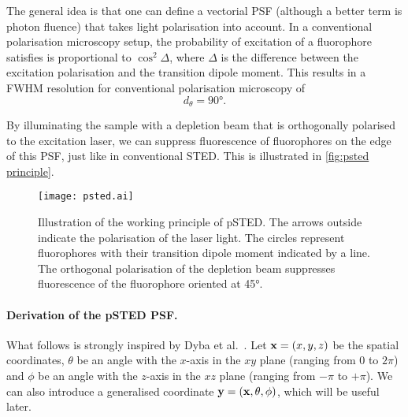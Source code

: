 The general idea is that one can define a vectorial PSF (although a better term is photon fluence) that takes light polarisation into account. In a conventional polarisation microscopy setup, the probability of excitation of a fluorophore satisfies is proportional to $ \cos^2 \Delta $, where $ \Delta $ is the difference between the excitation polarisation and the transition dipole moment. This results in a FWHM resolution for conventional polarisation microscopy of 
\begin{equation}
	d_\theta = \ang{90}.
\end{equation}


By illuminating the sample with a depletion beam that is orthogonally polarised to the excitation laser, we can suppress fluorescence of fluorophores on the edge of this PSF, just like in conventional STED. This is illustrated in \autoref{fig:psted principle}.

\begin{figure}
	\centering
	\texttt{[image: psted.ai]}
	\caption{
		Illustration of the working principle of pSTED. The arrows outside indicate the polarisation of the laser light. The circles represent fluorophores with their transition dipole moment indicated by a line. The orthogonal polarisation of the depletion beam suppresses fluorescence of the fluorophore oriented at \ang{45}.
	}
	\label{fig:psted principle}
\end{figure}

\paragraph{Derivation of the pSTED PSF.} What follows is strongly inspired by Dyba et al.~\cite{Dyba2005}. Let $ \vb{x} = (x, y, z)$ be the spatial coordinates, $ \theta $ be an angle with the $ x $-axis in the $ xy $ plane (ranging from $ 0 $ to $ 2\pi$) and $ \phi $ be an angle with the $ z $-axis in the $ xz $ plane (ranging from $ -\pi $ to $+\pi$). We can also introduce a generalised coordinate $ \vb{y} = (\vb{x}, \theta, \phi) $, which will be useful later.


